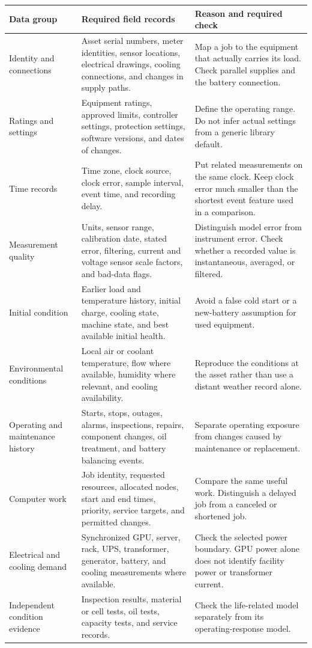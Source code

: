 \documentclass[11pt,a4paper]{report}
\begin{document}
\begin{longtable}{L{0.19\textwidth}L{0.34\textwidth}L{0.35\textwidth}}
\toprule Data group & Required field records & Reason and required check \\ \midrule\endhead
Identity and connections & Asset serial numbers, meter identities, sensor locations, electrical drawings, cooling connections, and changes in supply paths. & Map a job to the equipment that actually carries its load. Check parallel supplies and the battery connection. \\
Ratings and settings & Equipment ratings, approved limits, controller settings, protection settings, software versions, and dates of changes. & Define the operating range. Do not infer actual settings from a generic library default. \\
Time records & Time zone, clock source, clock error, sample interval, event time, and recording delay. & Put related measurements on the same clock. Keep clock error much smaller than the shortest event feature used in a comparison. \\
Measurement quality & Units, sensor range, calibration date, stated error, filtering, current and voltage sensor scale factors, and bad-data flags. & Distinguish model error from instrument error. Check whether a recorded value is instantaneous, averaged, or filtered. \\
Initial condition & Earlier load and temperature history, initial charge, cooling state, machine state, and best available initial health. & Avoid a false cold start or a new-battery assumption for used equipment. \\
Environmental conditions & Local air or coolant temperature, flow where available, humidity where relevant, and cooling availability. & Reproduce the conditions at the asset rather than use a distant weather record alone. \\
Operating and maintenance history & Starts, stops, outages, alarms, inspections, repairs, component changes, oil treatment, and battery balancing events. & Separate operating exposure from changes caused by maintenance or replacement. \\
Computer work & Job identity, requested resources, allocated nodes, start and end times, priority, service targets, and permitted changes. & Compare the same useful work. Distinguish a delayed job from a canceled or shortened job. \\
Electrical and cooling demand & Synchronized GPU, server, rack, UPS, transformer, generator, battery, and cooling measurements where available. & Check the selected power boundary. GPU power alone does not identify facility power or transformer current. \\
Independent condition evidence & Inspection results, material or cell tests, oil tests, capacity tests, and service records. & Check the life-related model separately from its operating-response model. \\
\bottomrule
\end{longtable}
\end{document}
